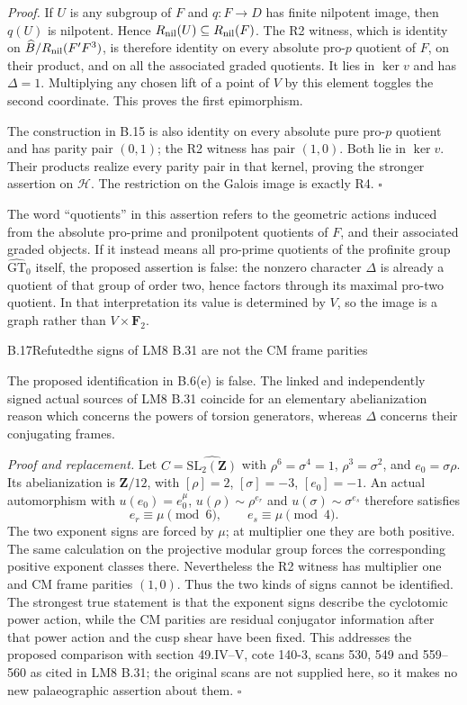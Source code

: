 \emph{Proof.}
If $U$ is any subgroup of $F$ and $q:F\to D$ has finite
nilpotent image, then $q(U)$ is nilpotent. Hence
$R_{\rm nil}(U)\subseteq R_{\rm nil}(F)$. The R2 witness,
which is identity on $\widehat B/R_{\rm nil}(F'F^3)$, is
therefore identity on every absolute pro-$p$ quotient of $F$,
on their product, and on all the associated graded quotients.
It lies in $\ker v$ and has $\Delta=1$. Multiplying any chosen
lift of a point of $V$ by this element toggles the second
coordinate. This proves the first epimorphism.

The construction in B.15 is also identity on every absolute
pure pro-$p$ quotient and has parity pair $(0,1)$; the R2
witness has pair $(1,0)$. Both lie in $\ker v$. Their products
realize every parity pair in that kernel, proving the stronger
assertion on $\mathcal H$. The restriction on the Galois image
is exactly R4. \hfill$\square$

The word ``quotients'' in this assertion refers to the geometric
actions induced from the absolute pro-prime and pronilpotent
quotients of $F$, and their associated graded objects. If it
instead means all pro-prime quotients of the profinite group
$\widehat{\mathrm{GT}}_0$ itself, the proposed assertion is false:
the nonzero character $\Delta$ is already a quotient of that group
of order two, hence factors through its maximal pro-two quotient.
In that interpretation its value is determined by $V$, so the
image is a graph rather than $V\times\mathbf F_2$.

\begin{statement}{B.17}{Refuted}{the signs of LM8 B.31 are not the CM frame parities}
\end{statement}
The proposed identification in B.6(e) is false. The linked and
independently signed actual sources of LM8 B.31 coincide for
an elementary abelianization reason which concerns the powers
of torsion generators, whereas $\Delta$ concerns their
conjugating frames.

\emph{Proof and replacement.}
Let $C=\widehat{\mathrm{SL}_2(\mathbf Z)}$ with
$\rho^6=\sigma^4=1$, $\rho^3=\sigma^2$, and $e_0=\sigma\rho$.
Its abelianization is $\mathbf Z/12$, with $[\rho]=2$,
$[\sigma]=-3$, $[e_0]=-1$. An actual automorphism with
$u(e_0)=e_0^\mu$, $u(\rho)\sim\rho^{e_r}$ and
$u(\sigma)\sim\sigma^{e_s}$ therefore satisfies
\[
              e_r\equiv\mu\pmod6,\qquad
              e_s\equiv\mu\pmod4.
\]
The two exponent signs are forced by $\mu$; at multiplier one
they are both positive. The same calculation on the projective
modular group forces the corresponding positive exponent
classes there. Nevertheless the R2 witness has multiplier one
and CM frame parities $(1,0)$. Thus the two kinds of signs
cannot be identified. The strongest true statement is that
the exponent signs describe the cyclotomic power action,
while the CM parities are residual conjugator information
after that power action and the cusp shear have been fixed.
This addresses the proposed comparison with section 49.IV--V,
cote 140-3, scans 530, 549 and 559--560 as cited in LM8 B.31;
the original scans are not supplied here, so it makes no new
palaeographic assertion about them. \hfill$\square$

